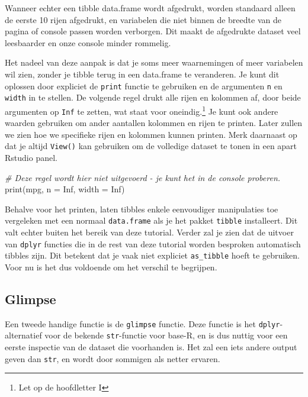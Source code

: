 \documentclass[]{tufte-book}
\newenvironment{Shaded}{}{}
\newcommand{\AttributeTok}[1]{\textcolor[rgb]{0.49,0.56,0.16}{#1}}
\newcommand{\CommentTok}[1]{\textcolor[rgb]{0.38,0.63,0.69}{\textit{#1}}}
\newcommand{\ConstantTok}[1]{\textcolor[rgb]{0.53,0.00,0.00}{#1}}
\newcommand{\FunctionTok}[1]{\textcolor[rgb]{0.02,0.16,0.49}{#1}}
\newcommand{\NormalTok}[1]{#1}
\begin{document}
Wanneer echter een tibble data.frame wordt afgedrukt, worden standaard alleen de eerste 10 rijen afgedrukt, en variabelen die niet binnen de breedte van de pagina of console passen worden verborgen. Dit maakt de afgedrukte dataset veel leesbaarder en onze console minder rommelig.

Het nadeel van deze aanpak is dat je soms meer waarnemingen of meer variabelen wil zien, zonder je tibble terug in een data.frame te veranderen. Je kunt dit oplossen door expliciet de \texttt{print} functie te gebruiken en de argumenten \texttt{n} en \texttt{width} in te stellen. De volgende regel drukt alle rijen en kolommen af, door beide argumenten op \texttt{Inf} te zetten, wat staat voor oneindig.\footnote{Let op de hoofdletter I} Je kunt ook andere waarden gebruiken om ander aantallen kolommen en rijen te printen. Later zullen we zien hoe we specifieke rijen en kolommen kunnen printen. Merk daarnaast op dat je altijd \texttt{View()} kan gebruiken om de volledige dataset te tonen in een apart Rstudio panel.

\begin{Shaded}
\begin{Highlighting}[]
\CommentTok{\# Deze regel wordt hier niet uitgevoerd {-} je kunt het in de console proberen.}
\FunctionTok{print}\NormalTok{(mpg, }\AttributeTok{n =} \ConstantTok{Inf}\NormalTok{, }\AttributeTok{width =} \ConstantTok{Inf}\NormalTok{)}
\end{Highlighting}
\end{Shaded}

Behalve voor het printen, laten tibbles enkele eenvoudiger manipulaties toe vergeleken met een normaal \texttt{data.frame} als je het pakket \texttt{tibble} installeert. Dit valt echter buiten het bereik van deze tutorial. Verder zal je zien dat de uitvoer van \texttt{dplyr} functies die in de rest van deze tutorial worden besproken automatisch tibbles zijn. Dit betekent dat je vaak niet expliciet \texttt{as\_tibble} hoeft te gebruiken. Voor nu is het dus voldoende om het verschil te begrijpen.

\hypertarget{glimpse}{%
\subsection{Glimpse}\label{glimpse}}

Een tweede handige functie is de \texttt{glimpse} functie. Deze functie is het \texttt{dplyr}-alternatief voor de bekende \texttt{str}-functie voor base-R, en is dus nuttig voor een eerste inspectie van de dataset die voorhanden is. Het zal een iets andere output geven dan \texttt{str}, en wordt door sommigen als netter ervaren.
\end{document}
